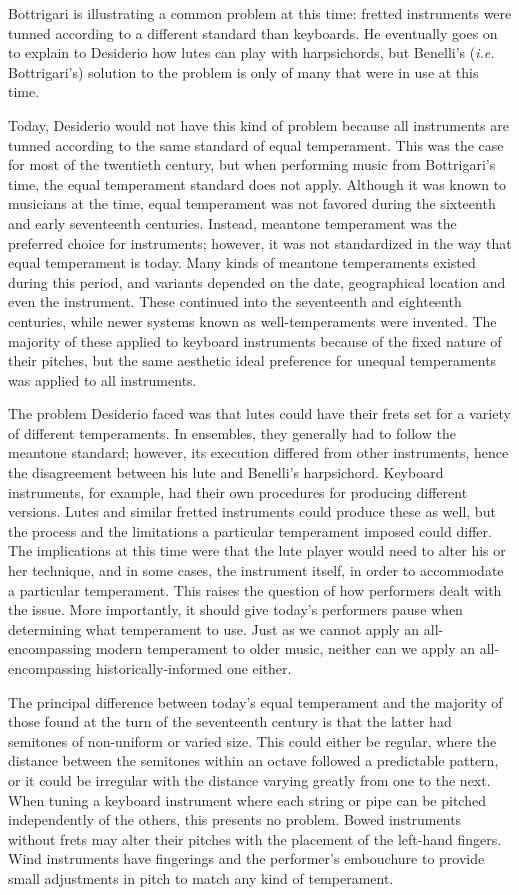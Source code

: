 Bottrigari is illustrating a common problem at this time: fretted instruments
were tunned according to a different standard than keyboards. He eventually goes
on to explain to Desiderio how lutes can play with harpsichords, but Benelli's
(\textit{i.e.} Bottrigari's) solution to the problem is only of many that  were
in use at this time.
  
Today, Desiderio would not have this kind of problem because all instruments are tunned according to
the same standard of equal temperament.  This was the case for most of the twentieth century, but
when performing music from Bottrigari's time, the equal temperament standard does not apply.
Although it was known to musicians at the time, equal temperament was not favored during the
sixteenth and early seventeenth centuries.  Instead, meantone temperament was the preferred choice
for instruments; however, it was not standardized in the way that equal temperament is today.  Many
kinds of meantone temperaments existed during this period, and variants depended on the date,
geographical location and even the instrument.  These continued into the seventeenth and eighteenth
centuries, while newer systems known as well-temperaments were invented.  The majority of these
applied to keyboard instruments because of the fixed nature of their pitches, but the same
aesthetic ideal preference for unequal temperaments was applied to all instruments.

The problem Desiderio faced was that lutes could have their frets set for a variety of different
temperaments.  In ensembles, they generally had to follow the meantone standard; however, its
execution differed from other instruments, hence the disagreement between his lute and Benelli's
harpsichord.  Keyboard instruments, for example, had their own procedures for producing different
versions.  Lutes and similar fretted instruments could produce these as well, but the process and
the limitations a particular temperament imposed could differ. The implications at
this time were that the lute player would need to alter his or her technique, and in some cases, the
instrument itself, in order to accommodate a particular temperament. This raises the question of how
performers dealt with the issue. More importantly, it should give today's performers
pause when determining what temperament to use.  Just as we cannot apply an all- encompassing modern
temperament to older music, neither can we apply an all- encompassing historically-informed one
either.

The principal difference between today's equal temperament and the majority of
those found at the turn of the seventeenth century is that the latter had
semitones of non-uniform or varied size.  This could either be regular, where
the distance between the semitones within an octave followed a predictable
pattern, or it could be irregular with the distance varying greatly from one to
the next. When tuning a keyboard instrument where each string or pipe can be
pitched independently of the others, this presents no problem.  Bowed
instruments without frets may alter their pitches with the placement of the
left-hand fingers.  Wind instruments have fingerings and the performer's
embouchure to provide small adjustments in pitch to match any kind of
temperament.

